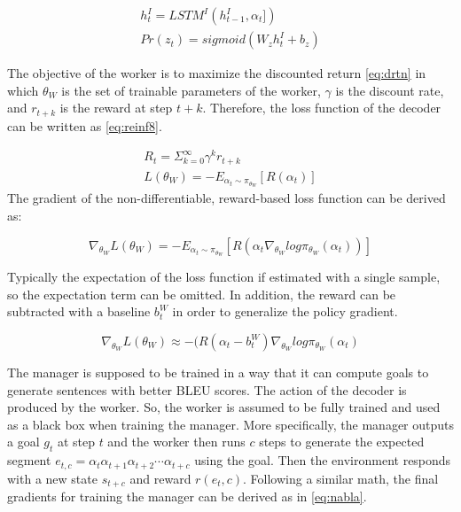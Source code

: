 \documentclass[preprint, 10pt]{elsarticle}
\begin{document}
		\begin{align}
			h_t^I = LSTM^I(h_{t-1}^I, \alpha_t]) \label{eq:reinf6} \\
			Pr(z_t) = sigmoid(W_zh_t^I + b_z) \label{eq:reinf7} 
		\end{align}
		
		The objective of the worker is to maximize the discounted return \eqref{eq:drtn} in which $\theta_W$ is the set of trainable parameters of the worker, $\gamma$ is the discount rate, and $r_{t+k}$ is the reward at step $t+k$. Therefore, the loss function of the decoder can be written as \eqref{eq:reinf8}.
		
		\begin{align}
			R_t = \Sigma_{k=0}^\infty \gamma^k r_{t+k} \label{eq:drtn} \\
			L(\theta_W) = -E_{\alpha_t \sim \pi_{\theta_W}}[R(\alpha_t)] \label{eq:reinf8}		
		\end{align}
		The gradient of the non-differentiable, reward-based loss function can be derived as:
		
		\begin{equation}
			\nabla_{\theta_W} L(\theta_W) = - E_{\alpha_t \sim \pi_{\theta_W}} [R(\alpha_t \nabla_{\theta_W} log \pi_{\theta_W}(\alpha_t))]
		\end{equation}
		
		Typically the expectation of the loss function if estimated with a single sample, so the expectation term can be omitted. In addition, the reward can be subtracted with a baseline $b_t^W$ in order to generalize the policy gradient.
		
		\begin{equation}
			\nabla_{\theta_W} L(\theta_W) \approx -(R(\alpha_t - b_t^W) \nabla_{\theta_W} log \pi_{\theta_W} (\alpha_t)
		\end{equation}
		
		The manager is supposed to be trained in a way that it can compute goals to generate sentences with better BLEU scores. The action of the decoder is produced by the worker. So, the worker is assumed to be fully trained and used as a black box when training the manager. More specifically, the manager outputs a goal $g_t$ at step $t$ and the worker then runs $c$ steps to generate the expected segment $e_{t, c} = \alpha_t \alpha_{t+1} \alpha_{t+2} \cdots \alpha_{t+c}$ using the goal. Then the environment responds with a new state $s_{t+c}$ and reward $r(e_t, c)$. Following a similar math, the final gradients for training the manager can be derived as in \eqref{eq:nabla}.
		
\end{document}
